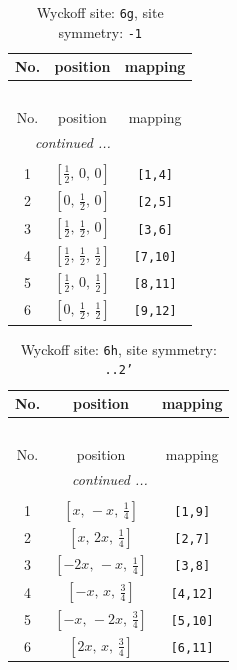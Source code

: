 \documentclass[fleqn,8pt]{jsarticle}
\begin{document}
\renewcommand{\arraystretch}{1.2}
\begin{longtable}{ccc}
\caption{Wyckoff site: {\tt 6g}, site symmetry: {\tt -1}}
 \\
 \hline \hline
No. & position & mapping \\ \hline \endfirsthead

\multicolumn{2}{l}{\tablename\ \thetable{}} \\
 \hline \hline
No. & position & mapping \\ \hline \endhead

 \hline \hline
\multicolumn{2}{r}{\footnotesize\it continued ...} \\ \endfoot

 \hline \hline
\multicolumn{2}{r}{} \\ \endlastfoot

1 & $\left[ \frac{1}{2},\, 0,\, 0 \right]$ & {\tt [1,4]} \\ \hline
2 & $\left[ 0,\, \frac{1}{2},\, 0 \right]$ & {\tt [2,5]} \\ \hline
3 & $\left[ \frac{1}{2},\, \frac{1}{2},\, 0 \right]$ & {\tt [3,6]} \\ \hline
4 & $\left[ \frac{1}{2},\, \frac{1}{2},\, \frac{1}{2} \right]$ & {\tt [7,10]} \\ \hline
5 & $\left[ \frac{1}{2},\, 0,\, \frac{1}{2} \right]$ & {\tt [8,11]} \\ \hline
6 & $\left[ 0,\, \frac{1}{2},\, \frac{1}{2} \right]$ & {\tt [9,12]} \\
\end{longtable}
\renewcommand{\arraystretch}{1.2}
\begin{longtable}{ccc}
\caption{Wyckoff site: {\tt 6h}, site symmetry: {\tt ..2'}}
 \\
 \hline \hline
No. & position & mapping \\ \hline \endfirsthead

\multicolumn{2}{l}{\tablename\ \thetable{}} \\
 \hline \hline
No. & position & mapping \\ \hline \endhead

 \hline \hline
\multicolumn{2}{r}{\footnotesize\it continued ...} \\ \endfoot

 \hline \hline
\multicolumn{2}{r}{} \\ \endlastfoot

1 & $\left[ x,\, - x,\, \frac{1}{4} \right]$ & {\tt [1,9]} \\ \hline
2 & $\left[ x,\, 2 x,\, \frac{1}{4} \right]$ & {\tt [2,7]} \\ \hline
3 & $\left[ - 2 x,\, - x,\, \frac{1}{4} \right]$ & {\tt [3,8]} \\ \hline
4 & $\left[ - x,\, x,\, \frac{3}{4} \right]$ & {\tt [4,12]} \\ \hline
5 & $\left[ - x,\, - 2 x,\, \frac{3}{4} \right]$ & {\tt [5,10]} \\ \hline
6 & $\left[ 2 x,\, x,\, \frac{3}{4} \right]$ & {\tt [6,11]} \\
\end{longtable}
\end{document}
